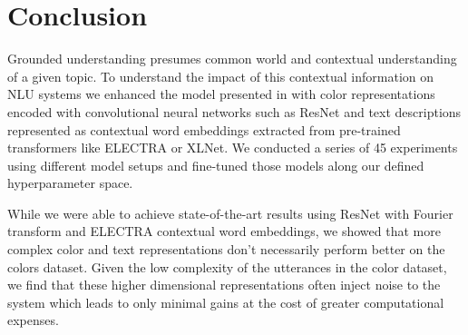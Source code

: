 \section{Conclusion}

Grounded understanding presumes common world and contextual understanding of a given topic. To understand the impact of this contextual information on NLU systems we enhanced the model presented in \citep{monroe-2017-colors} with color representations encoded with convolutional neural networks such as ResNet and text descriptions represented as contextual word embeddings extracted from pre-trained transformers like ELECTRA or XLNet. We conducted a series of 45 experiments using different model setups and fine-tuned those models along our defined hyperparameter space.

\par
While we were able to achieve state-of-the-art results using ResNet with Fourier transform and ELECTRA contextual word embeddings, we showed that more complex color and text representations don’t necessarily perform better on the colors dataset. Given the low complexity of the utterances in the color dataset, we find that these higher dimensional representations often inject noise to the system which leads to only minimal gains at the cost of greater computational expenses.
